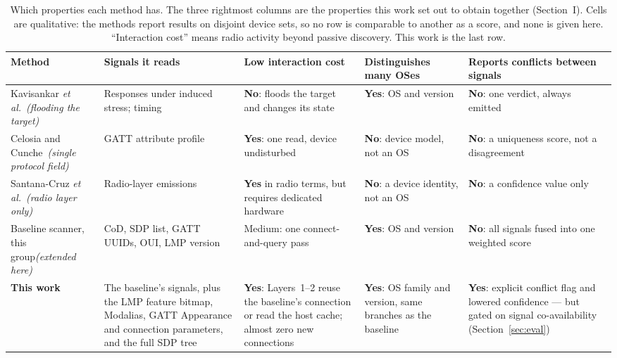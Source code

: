 \documentclass[conference]{IEEEtran}
\begin{document}
\begin{table}[!t]
\centering
\footnotesize
\setlength{\tabcolsep}{5pt}
\renewcommand{\arraystretch}{1.3}
\caption{Which properties each method has. The three rightmost
columns are the properties this work set out to obtain together (Section~I).
Cells are qualitative: the methods report results on disjoint device sets, so
no row is comparable to another as a score, and none is given here. ``Interaction
cost'' means radio activity beyond passive discovery. This work is the last
row.}
\label{tab:cap}
\begin{tabular}{@{}>{\raggedright\arraybackslash}p{3.3cm}
>{\raggedright\arraybackslash}p{2.9cm}
>{\raggedright\arraybackslash}p{3.5cm}
>{\raggedright\arraybackslash}p{2.6cm}
>{\raggedright\arraybackslash}p{3.4cm}@{}}
\toprule
\textbf{Method} & \textbf{Signals it reads} & \textbf{Low interaction cost}
& \textbf{Distinguishes many OSes} & \textbf{Reports conflicts between signals} \\
\midrule
Kavisankar \emph{et al.}~\cite{kavisankar2024osid}\newline \emph{(flooding the target)} &
Responses under induced stress; timing &
\textbf{No}: floods the target and changes its state &
\textbf{Yes}: OS and version &
\textbf{No}: one verdict, always emitted \\
\addlinespace
Celosia and Cunche~\cite{celosia2019gatt}\newline \emph{(single protocol field)} &
GATT attribute profile &
\textbf{Yes}: one read, device undisturbed &
\textbf{No}: device model, not an OS &
\textbf{No}: a uniqueness score, not a disagreement \\
\addlinespace
Santana-Cruz \emph{et al.}~\cite{santanacruz2024jsdivergence}\newline \emph{(radio layer only)} &
Radio-layer emissions &
\textbf{Yes} in radio terms, but requires dedicated hardware &
\textbf{No}: a device identity, not an OS &
\textbf{No}: a confidence value only \\
\addlinespace
Baseline scanner, this group\newline \emph{(extended here)} &
CoD, SDP list, GATT UUIDs, OUI, LMP version &
Medium: one connect-and-query pass &
\textbf{Yes}: OS and version &
\textbf{No}: all signals fused into one weighted score \\
\addlinespace
\textbf{This work} &
The baseline's signals, plus the LMP feature bitmap, Modalias, GATT
Appearance and connection parameters, and the full SDP tree &
\textbf{Yes}: Layers~1--2 reuse the baseline's connection or read the host
cache; almost zero new connections &
\textbf{Yes}: OS family and version, same branches as the baseline &
\textbf{Yes}: explicit conflict flag and lowered confidence --- but gated on
signal co-availability (Section~\ref{sec:eval}) \\
\bottomrule
\end{tabular}
\end{table}
\end{document}
